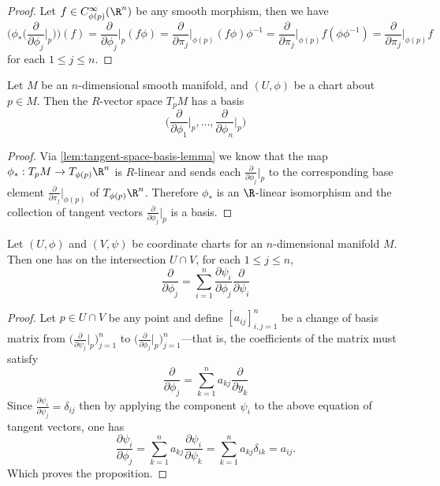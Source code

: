 \begin{proof}
Let \(f \in C_{\phi(p)}^{\infty}(\R^n)\) be any smooth morphism, then we have
\[
\Big( \phi_{*} \Big( \frac{\partial}{\partial \phi_j} \Big|_p \Big) \Big) (f)
= \frac{\partial}{\partial \phi_j}\Big|_p (f \phi)
= \frac{\partial}{\partial \pi_j}\Big|_{\phi(p)} (f \phi) \phi^{-1}
= \frac{\partial}{\partial \pi_j}\Big|_{\phi(p)} f (\phi \phi^{-1})
= \frac{\partial}{\partial \pi_j}\Big|_{\phi(p)} f
\]
for each \(1 \leq j \leq n\).
\end{proof}

\begin{proposition}
\label{prop:tangent-space-basis}
Let \(M\) be an \(n\)-dimensional smooth manifold, and \((U, \phi)\) be a chart
about \(p \in M\). Then the \(R\)-vector space \(T_p M\) has a basis
\[
\Big( \frac{\partial}{\partial \phi_1}\Big|_p, \dots,
\frac{\partial}{\partial \phi_n}\Big|_p \Big)
\]
\end{proposition}

\begin{proof}
Via \cref{lem:tangent-space-basis-lemma} we know that the map
\(\phi_{*}: T_p M \to T_{\phi(p)} \R^n\) is \(R\)-linear and sends each
\(\frac{\partial}{\partial \phi_j}\big|_p\) to the corresponding base element
\(\frac{\partial}{\partial \pi_j}\big|_{\phi(p)}\) of \(T_{\phi(p)}
\R^n\). Therefore \(\phi_{*}\) is an \(\R\)-linear isomorphism and the
collection of tangent vectors \(\frac{\partial}{\partial \phi_j}\big|_p\) is a
basis.
\end{proof}

\begin{proposition}
\label{prop:transition-matrix}
Let \((U, \phi)\) and \((V, \psi)\) be coordinate charts for an
\(n\)-dimensional manifold \(M\). Then one has on the intersection \(U \cap V\),
for each \(1 \leq j \leq n\),
\[
\frac{\partial}{\partial \phi_j}
= \sum_{i=1}^n \frac{\partial \psi_i}{\partial \phi_j}
\frac{\partial}{\partial \psi_i}
\]
\end{proposition}

\begin{proof}
Let \(p \in U \cap V\) be any point and define \([a_{ij}]_{i, j = 1}^n\)
be a change of basis matrix from
\(\big(\frac{\partial}{\partial \psi_j}\big|_p\big)_{j=1}^n\) to
\(\big(\frac{\partial}{\partial \phi_j}\big|_p\big)_{j=1}^n\)---that is, the
coefficients of the matrix must satisfy
\[
\frac{\partial}{\partial \phi_{j}}
= \sum_{k=1}^n a_{kj}\frac{\partial}{\partial y_k}
\]
Since \(\frac{\partial \psi_i}{\partial \psi_j} = \delta_{ij}\) then by
applying the component \(\psi_i\) to the above equation of tangent vectors, one
has
\[
\frac{\partial \psi_i}{\partial \phi_j}
= \sum_{k=1}^n a_{k j} \frac{\partial \psi_i}{\partial \psi_k}
= \sum_{k=1}^n a_{k j} \delta_{i k}
= a_{i j}.
\]
Which proves the proposition.
\end{proof}

